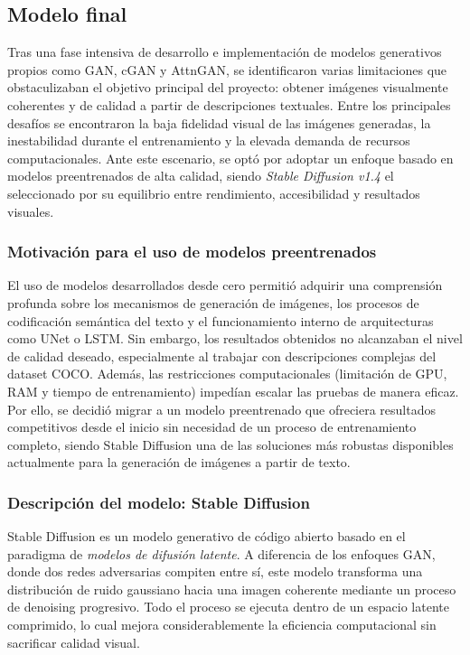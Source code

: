 \subsection{Modelo final}

Tras una fase intensiva de desarrollo e implementación de modelos generativos propios como GAN, cGAN y AttnGAN, se identificaron varias limitaciones que obstaculizaban el objetivo principal del proyecto: obtener imágenes visualmente coherentes y de calidad a partir de descripciones textuales. Entre los principales desafíos se encontraron la baja fidelidad visual de las imágenes generadas, la inestabilidad durante el entrenamiento y la elevada demanda de recursos computacionales. Ante este escenario, se optó por adoptar un enfoque basado en modelos preentrenados de alta calidad, siendo \textit{Stable Diffusion v1.4} el seleccionado por su equilibrio entre rendimiento, accesibilidad y resultados visuales.

\subsubsection{Motivación para el uso de modelos preentrenados}
El uso de modelos desarrollados desde cero permitió adquirir una comprensión profunda sobre los mecanismos de generación de imágenes, los procesos de codificación semántica del texto y el funcionamiento interno de arquitecturas como UNet o LSTM. Sin embargo, los resultados obtenidos no alcanzaban el nivel de calidad deseado, especialmente al trabajar con descripciones complejas del dataset COCO. Además, las restricciones computacionales (limitación de GPU, RAM y tiempo de entrenamiento) impedían escalar las pruebas de manera eficaz. Por ello, se decidió migrar a un modelo preentrenado que ofreciera resultados competitivos desde el inicio sin necesidad de un proceso de entrenamiento completo, siendo Stable Diffusion una de las soluciones más robustas disponibles actualmente para la generación de imágenes a partir de texto.

\subsubsection{Descripción del modelo: Stable Diffusion}
Stable Diffusion es un modelo generativo de código abierto basado en el paradigma de \textit{modelos de difusión latente}. A diferencia de los enfoques GAN, donde dos redes adversarias compiten entre sí, este modelo transforma una distribución de ruido gaussiano hacia una imagen coherente mediante un proceso de denoising progresivo. Todo el proceso se ejecuta dentro de un espacio latente comprimido, lo cual mejora considerablemente la eficiencia computacional sin sacrificar calidad visual.

